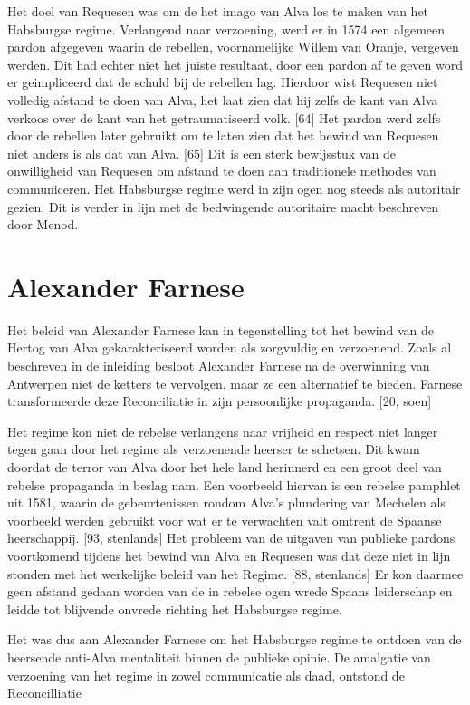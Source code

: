\documentclass[11pt]{amsart}
\begin{document}
Het doel van Requesen was om de het imago van Alva los te maken van het Habsburgse regime. Verlangend naar verzoening,
werd er in 1574 een algemeen pardon afgegeven waarin de rebellen, voornamelijke Willem van Oranje, vergeven werden. Dit
had echter niet het juiste resultaat, door een pardon af te geven word er geimpliceerd dat de schuld bij de rebellen
lag. Hierdoor wist Requesen niet volledig afstand te doen van Alva, het laat zien dat hij zelfs de kant van Alva
verkoos over de kant van het getraumatiseerd volk. [64] Het pardon werd zelfs door de rebellen later gebruikt om te
laten zien dat het bewind van Requesen niet anders is als dat van Alva. [65] Dit is een sterk bewijsstuk van de
onwilligheid van Requesen om afstand te doen aan traditionele methodes van communiceren. Het Habsburgse regime werd in
zijn ogen nog steeds als autoritair gezien. Dit is verder in lijn met de bedwingende autoritaire macht beschreven door
Menod.

\section*{Alexander Farnese}
\noindent

Het beleid van Alexander Farnese kan in tegenstelling tot het bewind van de Hertog van Alva gekarakteriseerd worden als
zorgvuldig en verzoenend. Zoals al beschreven in de inleiding besloot Alexander Farnese na de overwinning van Antwerpen
niet de ketters te vervolgen, maar ze een alternatief te bieden. Farnese transformeerde deze Reconciliatie in zijn
persoonlijke propaganda. [20, soen]

Het regime kon niet de rebelse verlangens naar vrijheid en respect niet langer tegen gaan door het regime als
verzoenende heerser te schetsen. Dit kwam doordat de terror van Alva door het hele land herinnerd en een groot deel van
rebelse propaganda in beslag nam. Een voorbeeld hiervan is een rebelse pamphlet uit 1581, waarin de gebeurtenissen
rondom Alva's plundering van Mechelen als voorbeeld werden gebruikt voor wat er te verwachten valt omtrent de Spaanse
heerschappij. [93, stenlands] Het probleem van de uitgaven van publieke pardons voortkomend tijdens het bewind van Alva
en Requesen was dat deze niet in lijn stonden met het werkelijke beleid van het Regime. [88, stenlands] Er kon daarmee
geen afstand gedaan worden van de in rebelse ogen wrede Spaans leiderschap en leidde tot blijvende onvrede richting het
Habsburgse regime.

Het was dus aan Alexander Farnese om het Habsburgse regime te ontdoen van de heersende anti-Alva mentaliteit binnen de
publieke opinie. De amalgatie van verzoening van het regime in zowel communicatie als daad, ontstond de Reconcilliatie
\end{document}
